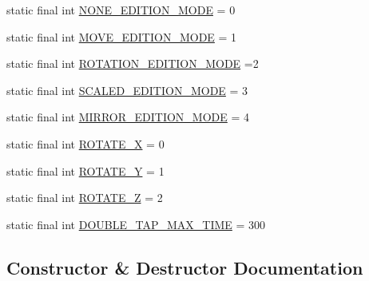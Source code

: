 \begin{DoxyCompactItemize}
static final int \hyperlink{classandroid_1_1app_1_1printerapp_1_1viewer_1_1_viewer_surface_view_a460bc4d4e9dfef2fb1278f517ed031f6}{N\+O\+N\+E\+\_\+\+E\+D\+I\+T\+I\+O\+N\+\_\+\+M\+O\+DE} = 0
\item 
static final int \hyperlink{classandroid_1_1app_1_1printerapp_1_1viewer_1_1_viewer_surface_view_a5553904bb1d28e3229cbcd5f478559e3}{M\+O\+V\+E\+\_\+\+E\+D\+I\+T\+I\+O\+N\+\_\+\+M\+O\+DE} = 1
\item 
static final int \hyperlink{classandroid_1_1app_1_1printerapp_1_1viewer_1_1_viewer_surface_view_a7021902efbc6c6499378ff62046ed2b5}{R\+O\+T\+A\+T\+I\+O\+N\+\_\+\+E\+D\+I\+T\+I\+O\+N\+\_\+\+M\+O\+DE} =2
\item 
static final int \hyperlink{classandroid_1_1app_1_1printerapp_1_1viewer_1_1_viewer_surface_view_a58b228d78cc5c9ffe233e5424a505e07}{S\+C\+A\+L\+E\+D\+\_\+\+E\+D\+I\+T\+I\+O\+N\+\_\+\+M\+O\+DE} = 3
\item 
static final int \hyperlink{classandroid_1_1app_1_1printerapp_1_1viewer_1_1_viewer_surface_view_ab4222d01ace6e7df450c5679a397b085}{M\+I\+R\+R\+O\+R\+\_\+\+E\+D\+I\+T\+I\+O\+N\+\_\+\+M\+O\+DE} = 4
\item 
static final int \hyperlink{classandroid_1_1app_1_1printerapp_1_1viewer_1_1_viewer_surface_view_aa6601c15fb4358ce47214400d9f9d584}{R\+O\+T\+A\+T\+E\+\_\+X} = 0
\item 
static final int \hyperlink{classandroid_1_1app_1_1printerapp_1_1viewer_1_1_viewer_surface_view_a541e9bc3053fe1de04a446c43bcdbeab}{R\+O\+T\+A\+T\+E\+\_\+Y} = 1
\item 
static final int \hyperlink{classandroid_1_1app_1_1printerapp_1_1viewer_1_1_viewer_surface_view_a8767b837b083b8b462aae1e9d8fb5d88}{R\+O\+T\+A\+T\+E\+\_\+Z} = 2
\item 
static final int \hyperlink{classandroid_1_1app_1_1printerapp_1_1viewer_1_1_viewer_surface_view_a4bf9a402818efb1016e89f0d1481997b}{D\+O\+U\+B\+L\+E\+\_\+\+T\+A\+P\+\_\+\+M\+A\+X\+\_\+\+T\+I\+ME} = 300
\end{DoxyCompactItemize}


\subsection{Constructor \& Destructor Documentation}
\mbox{\label{classandroid_1_1app_1_1printerapp_1_1viewer_1_1_viewer_surface_view_a7c828aef5e1ac634909872da0cbbbc1f}} 
